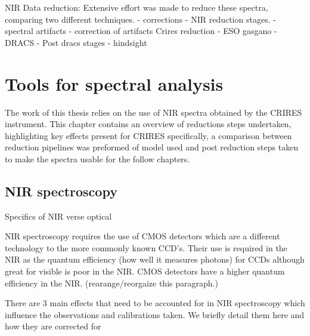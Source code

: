 %


NIR Data reduction:
Extensive effort was made to reduce these spectra, comparing two different techniques.
- corrections
- NIR reduction stages.
- spectral artifacts
- correction of artifacts
Crires reduction
- ESO gasgano
- DRACS
- Post dracs stages
- hindsight 



\chapter{Tools for spectral analysis}  %
\label{cha:reduction} 

The work of this thesis relies on the use of NIR spectra obtained by the CRIRES instrument. This chapter contains an overview of reductions steps undertaken, highlighting key effects present for CRIRES specifically, a comparison between reduction pipelines was preformed of model used and post reduction steps taken to make the spectra usable for the follow chapters.  

\section{NIR spectroscopy}
Specifics of NIR verse optical

NIR spectroscopy requires the use of CMOS detectors which are a different technology to the more commonly known CCD's. Their use is required in the NIR as the quantum efficiency (how well it measures photons) for CCDs although great for visible is poor in the NIR. CMOS detectors have a higher quantum efficiency in the NIR. 
\change(rearange/reorgaize this paragraph.)
%
%

There are 3 main effects that need to be accounted for in NIR spectroscopy which influence the observations and calibrations taken. We briefly detail them here and how they are corrected for

